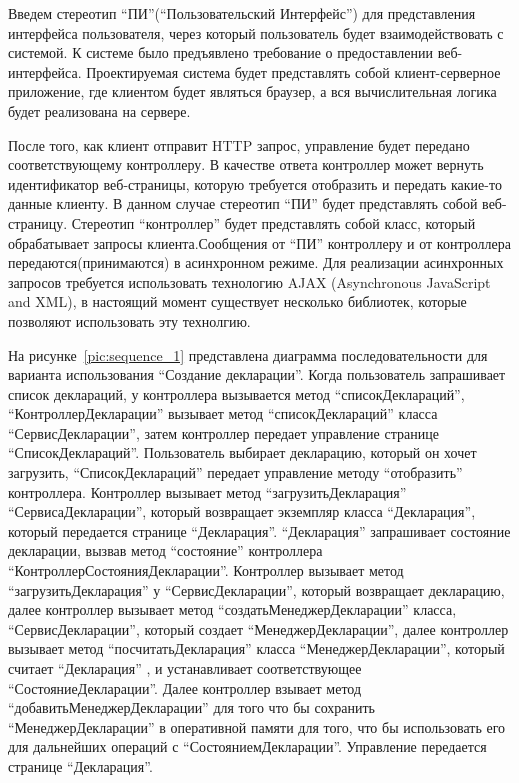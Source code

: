 \documentclass[14pt,a4paper]{reportmod}
\begin{document}
Введем стереотип ``ПИ''(``Пользовательский Интерфейс'') для представления интерфейса пользователя, через который пользователь будет взаимодействовать с системой. К системе было предъявлено требование о предоставлении веб-интерфейса. Проектируемая система будет представлять собой клиент-серверное приложение, где клиентом будет являться браузер, а вся вычислительная логика будет реализована на сервере.


После того, как клиент отправит HTTP запрос, управление будет передано соответствующему контроллеру. В качестве ответа контроллер может вернуть идентификатор веб-страницы, которую требуется отобразить и передать какие-то данные клиенту. В данном случае стереотип ``ПИ'' будет представлять собой веб-страницу. Стереотип ``контроллер'' будет представлять собой класс, который обрабатывает запросы клиента.Сообщения от ``ПИ'' контроллеру и от контроллера передаются(принимаются) в асинхронном режиме. Для реализации асинхронных запросов требуется использовать технологию AJAX (Asynchronous JavaScript and XML), в настоящий момент существует несколько библиотек, которые позволяют использовать эту технолгию.


На рисунке~\ref{pic:sequence_1} представлена диаграмма последовательности для варианта использования ``Создание декларации''. Когда пользователь запрашивает список деклараций, у контроллера вызывается метод ``списокДеклараций'', ``КонтроллерДекларации'' вызывает метод ``списокДеклараций'' класса ``СервисДекларации'', затем контроллер передает управление странице ``СписокДеклараций''. Пользователь выбирает декларацию, который он хочет загрузить, ``СписокДеклараций'' передает управление методу ``отобразить'' контроллера. Контроллер вызывает метод ``загрузитьДекларация'' ``СервисаДекларации'', который возвращает экземпляр класса ``Декларация'', который передается странице ``Декларация''. ``Декларация'' запрашивает состояние декларации, вызвав метод ``состояние'' контроллера ``КонтроллерСостоянияДекларации''. Контроллер вызывает метод ``загрузитьДекларация'' у ``СервисДекларации'', который возвращает декларацию, далее контроллер вызывает метод ``создатьМенеджерДекларации'' класса, ``СервисДекларации'', который создает ``МенеджерДекларации'', далее контроллер вызывает метод ``посчитатьДекларация'' класса ``МенеджерДекларации'', который считает ``Декларация'' , и устанавливает соответствующее ``СостояниеДекларации''. Далее контроллер взывает метод ``добавитьМенеджерДекларации'' для того что бы сохранить ``МенеджерДекларации'' в оперативной памяти для того, что бы использовать его для дальнейших операций с ``СостояниемДекларации''. Управление передается странице ``Декларация''.
\end{document}
